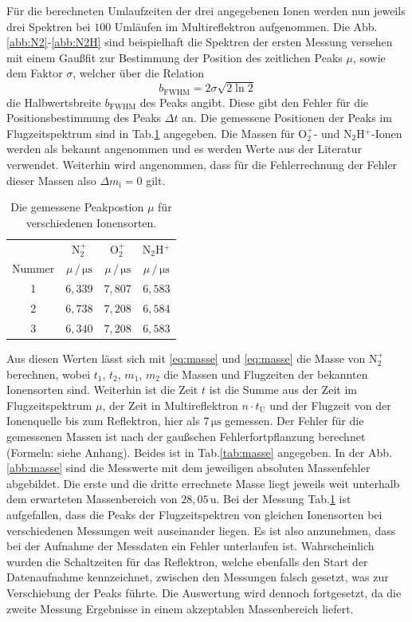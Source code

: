 \documentclass[numbers=noenddot,a4paper,notitlepage,twoside,BCOR15mm]{scrartcl}
\begin{document}
		Für die berechneten Umlaufzeiten der drei angegebenen Ionen werden nun jeweils drei Spektren bei $100$ Umläufen im Multireflektron aufgenommen. Die Abb.\ref{abb:N2}-\ref{abb:N2H} sind beispielhaft die Spektren der ersten Messung versehen mit einem Gaußfit zur Bestimmung der Position des zeitlichen Peaks $\mu$, sowie dem Faktor $\sigma$, welcher über die Relation
		\begin{equation}
			b_\mathrm{FWHM} = 2 \sigma\sqrt{2 \ln 2}
		\end{equation}
		die Halbwertsbreite $b_\mathrm{FWHM}$ des Peaks angibt. Diese gibt den Fehler für die Positionsbestimmung des Peaks $\Delta t$ an. Die gemessene Positionen der Peaks im Flugzeitspektrum sind in Tab.\ref{tab:zeit} angegeben. Die Massen für O${}_2^+$- und N${}_2$H$^+$-Ionen werden als bekannt angenommen und es werden Werte aus der Literatur verwendet. Weiterhin wird angenommen, dass für die Fehlerrechnung der Fehler dieser Massen also $\Delta m_\mathrm{i} = 0$ gilt.
		\begin{table}[t]
			\centering
			\caption{Die gemessene Peakpostion $\mu$ für verschiedenen Ionensorten.}
			\begin{tabular}{c|c c c} 
				 & N$_2^+$ & O$_2^+$ & N$_2$H$^+$ \\
				 Nummer & $\mu\,/\,\mathrm{\mu s}$ & $\mu\,/\,\mathrm{\mu s}$ & $\mu\,/\,\mathrm{\mu s}$ \\ \hline
				 1 & $6,339$ & $7,807$ & $6,583$ \\
				 2 & $6,738$ & $7,208$ & $6,584$ \\
				 3 & $6,340$ & $7,208$ & $6,583$ 
			\end{tabular}
			\label{tab:zeit}
		\end{table}
		Aus diesen Werten lässt sich mit \eqref{eq:masse} und \eqref{eq:masse} die Masse von N$_2^+$ berechnen, wobei $t_1$, $t_2$, $m_1$, $m_2$ die Massen und Flugzeiten der bekannten Ionensorten sind. Weiterhin ist die Zeit $t$ ist die Summe aus der Zeit im Flugzeitspektrum $\mu$, der Zeit in Multireflektron $n\cdot t_\mathrm{U}$ und der Flugzeit von der Ionenquelle bis zum Reflektron, hier als $7\,\mathrm{\mu s}$ gemessen. Der Fehler für die gemessenen Massen ist nach der gaußschen Fehlerfortpflanzung berechnet (Formeln: siehe Anhang). Beides ist in Tab.\ref{tab:masse} angegeben. In der Abb.\ref{abb:masse} sind die Messwerte mit dem jeweiligen absoluten Massenfehler abgebildet. Die erste und die dritte errechnete Masse liegt jeweils weit unterhalb dem erwarteten Massenbereich von $28,05\,\mathrm{u}$. Bei der Messung Tab.\ref{tab:zeit} ist aufgefallen, dass die Peaks der Flugzeitspektren von gleichen Ionensorten bei verschiedenen Messungen weit auseinander liegen. Es ist also anzunehmen, dass bei der Aufnahme der Messdaten ein Fehler unterlaufen ist. Wahrscheinlich wurden die Schaltzeiten für das Reflektron, welche ebenfalls den Start der Datenaufnahme kennzeichnet, zwischen den Messungen falsch gesetzt, was zur Verschiebung der Peaks führte. Die Auswertung wird dennoch fortgesetzt, da die zweite Messung Ergebnisse in einem akzeptablen Massenbereich liefert.
\end{document}
